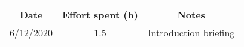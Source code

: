 \documentclass[../../main.tex]{subfiles}
\begin{document}
    \begin{center}
        \begin{tabular}{|c| |c| |c|} 
            \hline
            Date & Effort spent (h) & Notes\\ [0.5ex] 
            \hline\hline
            6/12/2020 & 1.5 & Introduction briefing\\ 
            \hline
        \end{tabular}
    \end{center}
\end{document}
